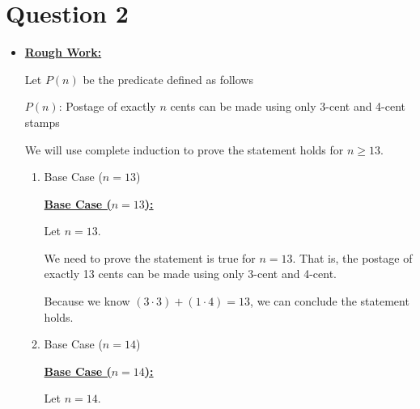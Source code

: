 \documentclass[12pt]{article}
\begin{document}
\section*{Question 2}
\begin{itemize}
    \item

    \bigskip

    \begin{mdframed}
        \underline{\textbf{Rough Work:}}

        \bigskip

        Let $P(n)$ be the predicate defined as follows

        \bigskip

        \begin{center}
            $P(n)$: Postage of exactly $n$ cents can be made using only 3-cent and 4-cent stamps
        \end{center}

        \bigskip

        We will use complete induction to prove the statement holds for $n \geq 13$.

        \begin{enumerate}[1.]
            \item Base Case ($n = 13$)

            \begin{mdframed}
            \underline{\textbf{Base Case ($n = 13$):}}

            \bigskip

            Let $n = 13$.

            \bigskip

            We need to prove the statement is true for $n = 13$. That is, the
            postage of exactly 13 cents can be made using only 3-cent and 4-cent.

            \bigskip

            Because we know $(3 \cdot 3) + (1 \cdot 4)=13$, we can conclude the statement holds.

            \end{mdframed}

            \item Base Case ($n = 14$)

            \begin{mdframed}
            \underline{\textbf{Base Case ($n = 14$):}}

            \bigskip

            Let $n = 14$.


\end{mdframed}
\end{enumerate}
\end{mdframed}
\end{itemize}
\end{document}
